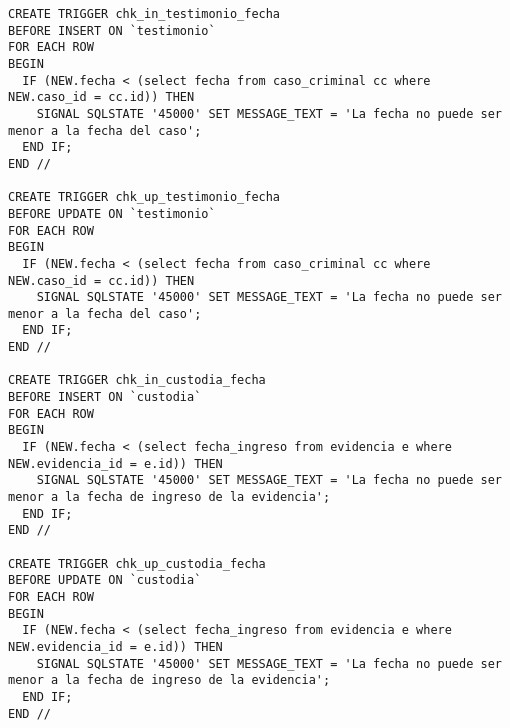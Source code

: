 \documentclass[10pt,a4paper]{article}
\begin{document}
\begin{verbatim}
CREATE TRIGGER chk_in_testimonio_fecha
BEFORE INSERT ON `testimonio`
FOR EACH ROW
BEGIN
  IF (NEW.fecha < (select fecha from caso_criminal cc where NEW.caso_id = cc.id)) THEN
    SIGNAL SQLSTATE '45000' SET MESSAGE_TEXT = 'La fecha no puede ser menor a la fecha del caso';
  END IF;
END //

CREATE TRIGGER chk_up_testimonio_fecha
BEFORE UPDATE ON `testimonio`
FOR EACH ROW
BEGIN
  IF (NEW.fecha < (select fecha from caso_criminal cc where NEW.caso_id = cc.id)) THEN
    SIGNAL SQLSTATE '45000' SET MESSAGE_TEXT = 'La fecha no puede ser menor a la fecha del caso';
  END IF;
END //

CREATE TRIGGER chk_in_custodia_fecha
BEFORE INSERT ON `custodia`
FOR EACH ROW
BEGIN
  IF (NEW.fecha < (select fecha_ingreso from evidencia e where NEW.evidencia_id = e.id)) THEN
    SIGNAL SQLSTATE '45000' SET MESSAGE_TEXT = 'La fecha no puede ser menor a la fecha de ingreso de la evidencia';
  END IF;
END //

CREATE TRIGGER chk_up_custodia_fecha
BEFORE UPDATE ON `custodia`
FOR EACH ROW
BEGIN
  IF (NEW.fecha < (select fecha_ingreso from evidencia e where NEW.evidencia_id = e.id)) THEN
    SIGNAL SQLSTATE '45000' SET MESSAGE_TEXT = 'La fecha no puede ser menor a la fecha de ingreso de la evidencia';
  END IF;
END //
\end{verbatim}
\end{document}
